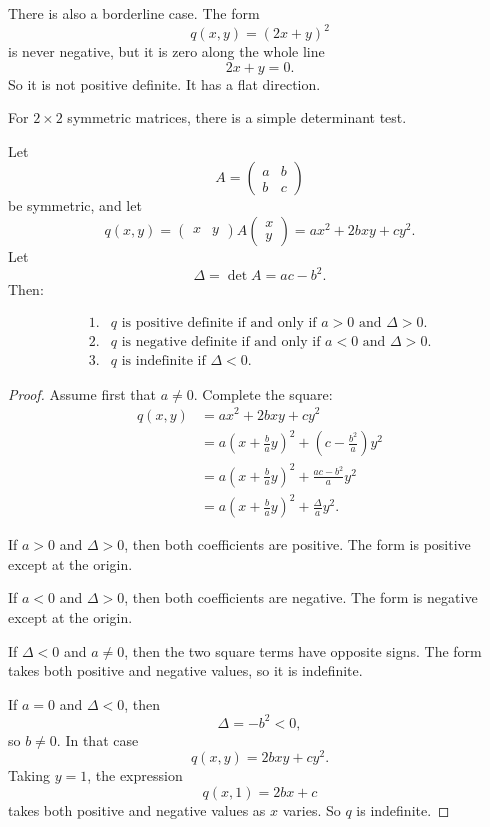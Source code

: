 There is also a borderline case.  The form
\[
    q(x,y)=(2x+y)^2
\]
is never negative, but it is zero along the whole line
\[
    2x+y=0.
\]
So it is not positive definite.  It has a flat direction.

For \(2\times2\) symmetric matrices, there is a simple determinant test.

\begin{theorem}
Let
\[
    A=
    \begin{pmatrix}
        a&b\\
        b&c
    \end{pmatrix}
\]
be symmetric, and let
\[
    q(x,y)=
    \begin{pmatrix}x&y\end{pmatrix}
    A
    \begin{pmatrix}
        x\\y
    \end{pmatrix}
    =
    ax^2+2bxy+cy^2.
\]
Let
\[
    \Delta=\det A=ac-b^2.
\]
Then:

\[
\begin{array}{ll}
1. & q \text{ is positive definite if and only if } a>0 \text{ and } \Delta>0.\\[0.3em]
2. & q \text{ is negative definite if and only if } a<0 \text{ and } \Delta>0.\\[0.3em]
3. & q \text{ is indefinite if } \Delta<0.
\end{array}
\]
\end{theorem}

\begin{proof}
Assume first that \(a\neq0\).  Complete the square:
\[
\begin{aligned}
    q(x,y)
    &=
    ax^2+2bxy+cy^2\\
    &=
    a\left(x+\frac ba y\right)^2
    +
    \left(c-\frac{b^2}{a}\right)y^2\\
    &=
    a\left(x+\frac ba y\right)^2
    +
    \frac{ac-b^2}{a}y^2\\
    &=
    a\left(x+\frac ba y\right)^2
    +
    \frac{\Delta}{a}y^2.
\end{aligned}
\]

If \(a>0\) and \(\Delta>0\), then both coefficients are positive.  The form is positive
except at the origin.

If \(a<0\) and \(\Delta>0\), then both coefficients are negative.  The form is negative
except at the origin.

If \(\Delta<0\) and \(a\neq0\), then the two square terms have opposite signs.  The
form takes both positive and negative values, so it is indefinite.

If \(a=0\) and \(\Delta<0\), then
\[
    \Delta=-b^2<0,
\]
so \(b\neq0\).  In that case
\[
    q(x,y)=2bxy+cy^2.
\]
Taking \(y=1\), the expression
\[
    q(x,1)=2bx+c
\]
takes both positive and negative values as \(x\) varies.  So \(q\) is indefinite.
\end{proof}

